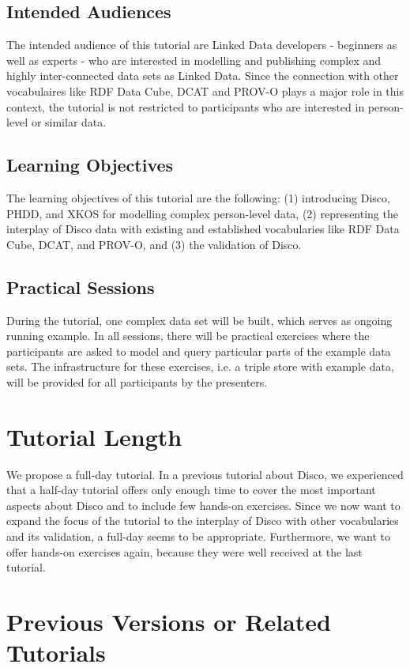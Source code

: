 \documentclass{llncs}
\begin{document}
\subsection{Intended Audiences}
The intended audience of this tutorial are Linked Data developers - beginners as well as experts - who are interested in modelling and publishing complex and highly inter-connected data sets as Linked Data. Since the connection with other vocabulaires like RDF Data Cube, DCAT and PROV-O plays a major role in this context, the tutorial is not restricted to participants who are interested in person-level or similar data.

\subsection{Learning Objectives}
The learning objectives of this tutorial are the following: (1) introducing Disco, PHDD, and XKOS for modelling complex person-level data, (2) representing the interplay of Disco data with existing and established vocabularies like RDF Data Cube, DCAT, and PROV-O, and (3) the validation of Disco.


\subsection{Practical Sessions}
During the tutorial, one complex data set will be built, which serves as ongoing running example. In all sessions, there will be practical exercises where the participants are asked to model and query particular parts of the example data sets. The infrastructure for these exercises, i.e. a triple store with example data, will be provided for all participants by the presenters.

\section{Tutorial Length}

We propose a full-day tutorial. In a previous tutorial about Disco, we experienced that a half-day tutorial offers only enough time to cover the most important aspects about Disco and to include few hands-on exercises. Since we now want to expand the focus of the tutorial to the interplay of Disco with other vocabularies and its validation, a full-day seems to be appropriate. Furthermore, we want to offer hands-on exercises again, because they were well received at the last tutorial.

\section{Previous Versions or Related Tutorials}
\end{document}
